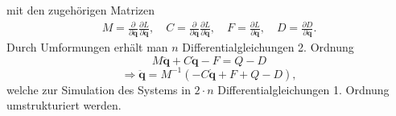 \documentclass[10pt,a4paper]{iace.report}
\begin{document}
			mit den zugehörigen Matrizen
			\begin{align*}
			M = \frac{\partial}{\partial\dot{\bm{q}}}\frac{\partial L}{\partial\dot{\bm{q}}}, \quad 
			C = \frac{\partial}{\partial\bm{q}}\frac{\partial L}{\partial\dot{\bm{q}}}, \quad
			F = \frac{\partial L}{\partial\bm{q}}, \quad 
			D = \frac{\partial D}{\partial\dot{\bm{q}}}.
			\end{align*}
			Durch Umformungen erhält man $ n $ Differentialgleichungen 2. Ordnung
			\[ M\ddot{\bm{q}} + C\dot{\bm{q}} - F = Q - D\]
			\begin{equation*}
			\Rightarrow \ddot{\bm{q}}=  M^{-1}(-C\dot{\bm{q}} + F + Q - D),
			\end{equation*}
			welche zur Simulation des Systems in $ 2\cdot n $ Differentialgleichungen 1. Ordnung umstrukturiert werden. 					
		
\end{document}
